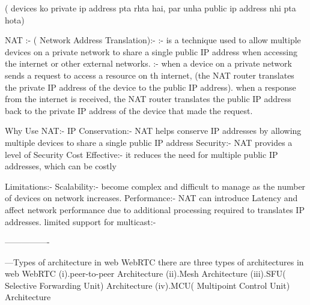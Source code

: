             ( devices ko private ip address pta rhta hai, par unha public ip address nhi pta hota)

NAT :- ( Network Address Translation):- 
            :- is a technique used to allow multiple devices on a private network to share a single public IP address when accessing the internet or other external networks.
            :- when a device on a private network sends a request to access a resource on th internet,  (the NAT router translates the private IP address of the device to the public IP address). when a response from the internet is received, the NAT router translates the public IP address back to the private IP address of the device  that made the request.
       
        Why Use NAT:-
        IP Conservation:- NAT helps conserve IP addresses by allowing multiple devices to share a single public IP address
        Security:- NAT provides a level of Security
        Cost Effective:- it reduces the need for multiple public IP addresses, which can be costly

        Limitations:-
        Scalability:- become complex and difficult to manage as the number of devices on network increases.
        Performance:- NAT can introduce Latency and affect network performance due to additional processing required to translates IP addresses.
        limited support for multicast:-  

----------------

---Types of architecture in web WebRTC
    there are three types of architectures in web WebRTC
    (i).peer-to-peer Architecture
    (ii).Mesh Architecture
    (iii).SFU( Selective Forwarding Unit) Architecture
    (iv).MCU( Multipoint Control Unit) Architecture



